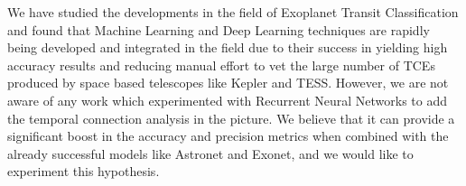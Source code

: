 We have studied the developments in the field of Exoplanet Transit Classification and found that Machine Learning and Deep Learning techniques are rapidly being developed and integrated in the field due to their success in yielding high accuracy results and reducing manual effort to vet the large number of TCEs produced by space based telescopes like Kepler and TESS. However, we are not aware of any work which experimented with Recurrent Neural Networks to add the temporal connection analysis in the picture. We believe that it can provide a significant boost in the accuracy and precision metrics when combined with the already successful models like Astronet and Exonet, and we would like to experiment this hypothesis.